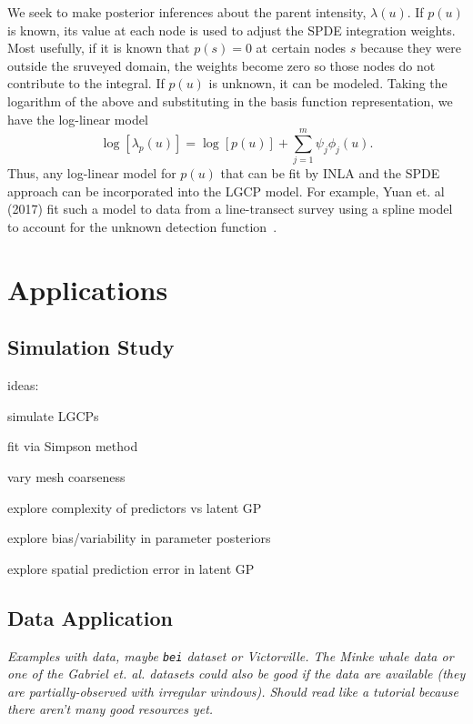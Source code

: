 \documentclass[]{interact}
\begin{document}
We seek to make posterior inferences about the parent intensity,
\(\lambda(u)\). If \(p(u)\) is known, its value at each node is used to
adjust the SPDE integration weights. Most usefully, if it is known that
\(p(s) = 0\) at certain nodes \(s\) because they were outside the sruveyed
domain, the weights become zero so those nodes do not contribute to the
integral. If \(p(u)\) is unknown, it can be modeled. Taking the logarithm of
the above and substituting in the basis function representation, we have the
log-linear model
\begin{displaymath}
\log\left[\lambda_{p}(u)\right]
= \log\left[p(u)\right] + \sum_{j = 1}^{m} \psi_{j} \phi_{j}(u).
\end{displaymath}
Thus, any log-linear model for \(p(u)\) that can be fit by INLA and the SPDE
approach can be incorporated into the LGCP model. For example, Yuan et. al
(2017) fit such a model to data from a line-transect survey using a spline
model to account for the unknown detection function~\cite{yuanetal}.


\section{Applications}


\subsection{Simulation Study}

ideas:

simulate LGCPs

fit via Simpson method

vary mesh coarseness

explore complexity of predictors vs latent GP

explore bias/variability in parameter posteriors

explore spatial prediction error in latent GP


\subsection{Data Application}

{\it Examples with data, maybe \texttt{bei} dataset or Victorville. The Minke
whale data or one of the Gabriel et. al. datasets could also be good if the
data are available (they are partially-observed with irregular windows). Should
read like a tutorial because there aren't many good resources yet.}
\end{document}
